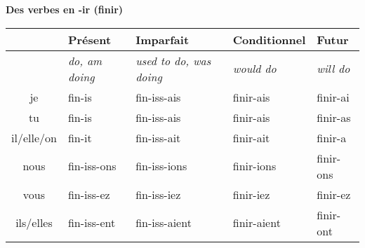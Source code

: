 \begin{comment}
\renewcommand{\stemFutur}{choisir}
\renewcommand{\stemPresent}{chois}
\begin{center}
\textbf{Des verbes en -ir (choisir)}
\vskip 0.1cm
\begin{tabular}{|c||L{3cm}|L{3cm}|L{3cm}|L{3cm}|}
\hline
& Pr\'esent & Imparfait & Conditionnel & Futur \\
\hline
& \textit{do, am doing} & \textit{used to do, was doing} & \textit{would do} & \textit{will do} \\
\hline\hline
je           &	\stemPresent-is 	&	\stemPresent-iss-ais	&	\stemFutur-ais	 &	\stemFutur-ai	\\
tu           &	\stemPresent-is	&	\stemPresent-iss-ais	&	\stemFutur-ais	&	\stemFutur-as	\\
il/elle/on &	\stemPresent-it	&	\stemPresent-iss-ait	&	\stemFutur-ait	&	\stemFutur-a	\\
nous      &	\stemPresent-issons	&	\stemPresent-iss-ions	&	\stemFutur-ions	&	\stemFutur-ons	\\
vous      &	\stemPresent-issez	&	\stemPresent-iss-iez	&	\stemFutur-iez		&	\stemFutur-ez	\\
ils/elles  &	\stemPresent-issent	&	\stemPresent-iss-aient	&	\stemFutur-aient	&	\stemFutur-ont	\\
\hline
\end{tabular}
\end{center}
\end{comment}

\vskip 1.5cm
\renewcommand{\stemPresent}{fin}
\renewcommand{\stemFutur}{finir}
\begin{center}
\textbf{Des verbes en -ir (finir)}
\vskip 0.1cm
\begin{tabular}{|c||L{3cm}|L{3cm}|L{3cm}|L{3cm}|}
\hline
& Pr\'esent & Imparfait & Conditionnel & Futur \\
\hline
& \textit{do, am doing} & \textit{used to do, was doing} & \textit{would do} & \textit{will do} \\
\hline\hline
je           &	\stemPresent-is 	&	\stemPresent-iss-ais	&	\stemFutur-ais	 &	\stemFutur-ai	\\
tu           &	\stemPresent-is	&	\stemPresent-iss-ais	&	\stemFutur-ais	&	\stemFutur-as	\\
il/elle/on &	\stemPresent-it	&	\stemPresent-iss-ait	&	\stemFutur-ait	&	\stemFutur-a	\\
nous      &	\stemPresent-iss-ons	&	\stemPresent-iss-ions	&	\stemFutur-ions	&	\stemFutur-ons	\\
vous      &	\stemPresent-iss-ez	&	\stemPresent-iss-iez	&	\stemFutur-iez		&	\stemFutur-ez	\\
ils/elles  &	\stemPresent-iss-ent	&	\stemPresent-iss-aient	&	\stemFutur-aient	&	\stemFutur-ont	\\
\hline
\end{tabular}
\end{center}

